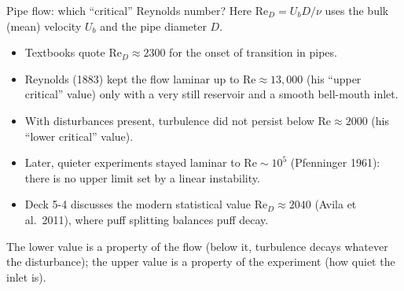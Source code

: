 \documentclass[aspectratio=169,11pt]{beamer}
\newcommand{\Rey}{\mathrm{Re}}
\begin{document}
\begin{frame}{Pipe flow: which ``critical'' Reynolds number?}
Here $\Rey_D=U_bD/\nu$ uses the bulk (mean) velocity $U_b$ and the pipe diameter $D$.
\begin{itemize}\itemsep4pt
  \item Textbooks quote $\Rey_D\approx 2300$ for the onset of transition in pipes.
  \item Reynolds (1883) kept the flow laminar up to $\Rey\approx 13{,}000$ (his ``upper critical'' value) only with a very still reservoir and a smooth bell-mouth inlet.
  \item With disturbances present, turbulence did not persist below $\Rey\approx 2000$ (his ``lower critical'' value).
  \item Later, quieter experiments stayed laminar to $\Rey\sim10^5$ (Pfenninger 1961): there is no upper limit set by a linear instability.
  \item Deck 5-4 discusses the modern statistical value $\Rey_D\approx 2040$ (Avila et al.\ 2011), where puff splitting balances puff decay.
\end{itemize}

\begin{punchbox}
The lower value is a property of the flow (below it, turbulence decays whatever the disturbance); the upper value is a property of the experiment (how quiet the inlet is).
\end{punchbox}
\end{frame}
\end{document}
